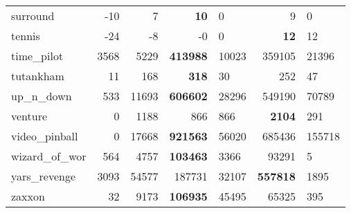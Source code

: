 \documentclass{article}
\begin{document}
\begin{table*}[tb]
\begin{center}
\begin{small}
\begin{tabular}{lrrrlrl}
surround & -10 & 7 & {\bf 10} & 0 & 9 & 0 \\
tennis & -24 & -8 & -0 & 0 & {\bf 12} & 12 \\
time\_pilot & 3568 & 5229 & {\bf 413988} & 10023 & 359105 & 21396 \\
tutankham & 11 & 168 & {\bf 318} & 30 & 252 & 47 \\
up\_n\_down & 533 & 11693 & {\bf 606602} & 28296 & 549190 & 70789 \\
venture & 0 & 1188 & 866 & 866 & {\bf 2104} & 291 \\
video\_pinball & 0 & 17668 & {\bf 921563} & 56020 & 685436 & 155718 \\
wizard\_of\_wor & 564 & 4757 & {\bf 103463} & 3366 & 93291 & 5 \\
yars\_revenge & 3093 & 54577 & 187731 & 32107 & {\bf 557818} & 1895 \\
zaxxon & 32 & 9173 & {\bf 106935} & 45495 & 65325 & 395 \\
\bottomrule
\end{tabular}
\end{small}
\end{center}
\vskip -0.1in
\end{table*}

  
\end{document}
